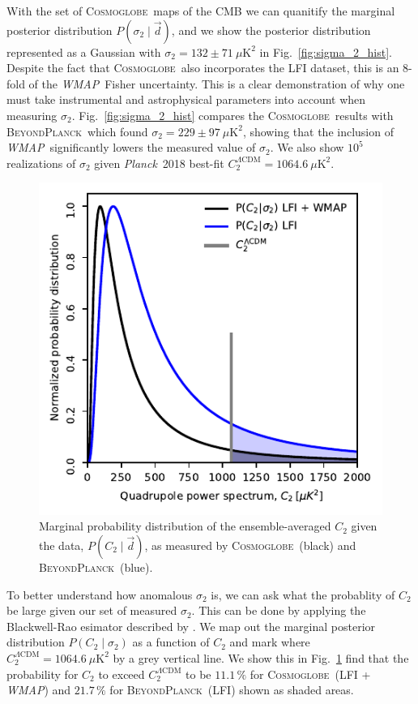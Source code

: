 \documentclass[twocolumn]{../../common/aa}
\def\WMAP{\emph{WMAP}}
\def\Planck{\emph{Planck}}
\newcommand{\BP}{\textsc{BeyondPlanck}}
\newcommand{\bp}{\textsc{BeyondPlanck}}
\newcommand{\cosmoglobe}{\textsc{Cosmoglobe}}
\newcommand{\Cosmoglobe}{\textsc{Cosmoglobe}}
\newcommand{\data}{\vec d}
\begin{document}
With the set of \cosmoglobe\ maps of the CMB we can quanitify the marginal posterior distribution $P(\sigma_2 \mid \data)$, and we show the posterior distribution represented as a Gaussian with ${\sigma_2 = 132 \pm 71\ \mu \mathrm{K}^2}$ in Fig.~\ref{fig:sigma_2_hist}. Despite the fact that \Cosmoglobe\ also incorporates the LFI dataset, this is an 8-fold of the \WMAP\ Fisher uncertainty. This is a clear demonstration of  why one must take instrumental and astrophysical parameters into account when measuring $\sigma_2$. Fig.~\ref{fig:sigma_2_hist} compares the \cosmoglobe\ results with \bp\ which found $\sigma_2 = 229\pm 97\ \mu\mathrm{K}^2$, showing that the inclusion of \WMAP\ significantly lowers the measured value of $\sigma_2$. We also show $10^5$ realizations of $\sigma_2$ given \Planck\ 2018 best-fit $C^{\Lambda \mathrm{CDM}}_2 = 1064.6\ \mu\mathrm{K}^2$.


\begin{figure}
	\includegraphics[width=\columnwidth]{figures/WMAP_blackwell-rao.pdf}
	\caption{Marginal probability distribution of the ensemble-averaged $C_2$ given the data, $P(C_2\mid\data)$, as measured by \Cosmoglobe\ (black) and \BP\ (blue).}
	\label{fig:blackwell_rao_sigma_2}
\end{figure}

To better understand how anomalous $\sigma_2$ is, we can ask what the probablity of $C_2$ be large given our set of measured $\sigma_2$. This can be done by applying the Blackwell-Rao esimator described by \citet{chu2005}. We map out the marginal posterior distribution $P(C_2 \mid \sigma_2)$ as a function of $C_2$ and mark where $C^{\Lambda \mathrm{CDM}}_2 = 1064.6\ \mu\mathrm{K}^2$ by a grey vertical line. We show this in Fig.~\ref{fig:blackwell_rao_sigma_2} find that the probability for $C_2$ to exceed $C^{\Lambda \mathrm{CDM}}_2$ to be $11.1\,\%$ for \cosmoglobe\ (LFI + \WMAP) and $21.7\,\%$ for \bp\ (LFI) shown as shaded areas.
\end{document}
